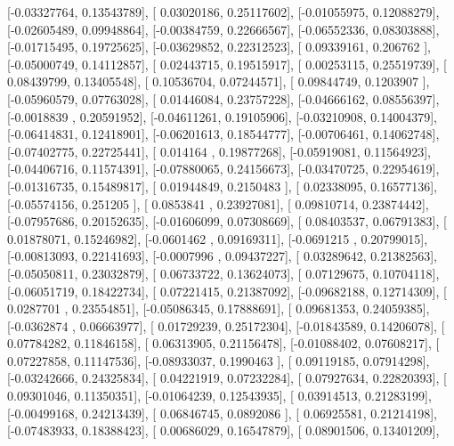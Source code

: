 \documentclass{article}
\begin{document}
       [-0.03327764,  0.13543789],
       [ 0.03020186,  0.25117602],
       [-0.01055975,  0.12088279],
       [-0.02605489,  0.09948864],
       [-0.00384759,  0.22666567],
       [-0.06552336,  0.08303888],
       [-0.01715495,  0.19725625],
       [-0.03629852,  0.22312523],
       [ 0.09339161,  0.206762  ],
       [-0.05000749,  0.14112857],
       [ 0.02443715,  0.19515917],
       [ 0.00253115,  0.25519739],
       [ 0.08439799,  0.13405548],
       [ 0.10536704,  0.07244571],
       [ 0.09844749,  0.1203907 ],
       [-0.05960579,  0.07763028],
       [ 0.01446084,  0.23757228],
       [-0.04666162,  0.08556397],
       [-0.0018839 ,  0.20591952],
       [-0.04611261,  0.19105906],
       [-0.03210908,  0.14004379],
       [-0.06414831,  0.12418901],
       [-0.06201613,  0.18544777],
       [-0.00706461,  0.14062748],
       [-0.07402775,  0.22725441],
       [ 0.014164  ,  0.19877268],
       [-0.05919081,  0.11564923],
       [-0.04406716,  0.11574391],
       [-0.07880065,  0.24156673],
       [-0.03470725,  0.22954619],
       [-0.01316735,  0.15489817],
       [ 0.01944849,  0.2150483 ],
       [ 0.02338095,  0.16577136],
       [-0.05574156,  0.251205  ],
       [ 0.0853841 ,  0.23927081],
       [ 0.09810714,  0.23874442],
       [-0.07957686,  0.20152635],
       [-0.01606099,  0.07308669],
       [ 0.08403537,  0.06791383],
       [ 0.01878071,  0.15246982],
       [-0.0601462 ,  0.09169311],
       [-0.0691215 ,  0.20799015],
       [-0.00813093,  0.22141693],
       [-0.0007996 ,  0.09437227],
       [ 0.03289642,  0.21382563],
       [-0.05050811,  0.23032879],
       [ 0.06733722,  0.13624073],
       [ 0.07129675,  0.10704118],
       [-0.06051719,  0.18422734],
       [ 0.07221415,  0.21387092],
       [-0.09682188,  0.12714309],
       [ 0.0287701 ,  0.23554851],
       [-0.05086345,  0.17888691],
       [ 0.09681353,  0.24059385],
       [-0.0362874 ,  0.06663977],
       [ 0.01729239,  0.25172304],
       [-0.01843589,  0.14206078],
       [ 0.07784282,  0.11846158],
       [ 0.06313905,  0.21156478],
       [-0.01088402,  0.07608217],
       [ 0.07227858,  0.11147536],
       [-0.08933037,  0.1990463 ],
       [ 0.09119185,  0.07914298],
       [-0.03242666,  0.24325834],
       [ 0.04221919,  0.07232284],
       [ 0.07927634,  0.22820393],
       [ 0.09301046,  0.11350351],
       [-0.01064239,  0.12543935],
       [ 0.03914513,  0.21283199],
       [-0.00499168,  0.24213439],
       [ 0.06846745,  0.0892086 ],
       [ 0.06925581,  0.21214198],
       [-0.07483933,  0.18388423],
       [ 0.00686029,  0.16547879],
       [ 0.08901506,  0.13401209],
\end{document}
